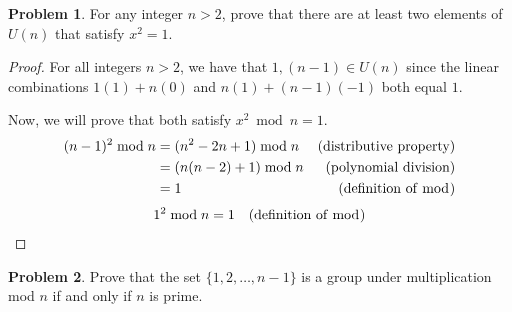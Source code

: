 \documentclass[12pt,reqno]{article}
\theoremstyle{plain}
\theoremstyle{definition}
\newtheorem{problem}{Problem}
\begin{document}
\newpage


\begin{problem} 
For any integer $n > 2$, prove that there are at least two elements of $U(n)$ that satisfy $x^2 = 1$. 
\end{problem}

\begin{proof}
    For all integers $n>2$, we have that $1,(n-1)\in U(n)$ since the linear combinations $1(1) + n(0)$ and $n(1)+(n-1)(-1)$ both equal $1$.

    Now, we will prove that both satisfy $x^2\bmod{n}=1$.
    \begin{align*}
        (n-1)^2\bmod{n} &= (n^2-2n+1)\bmod{n} & \text{(distributive property)}\\
        &= (n(n-2) + 1)\bmod{n} & \text{(polynomial division)}\\
        &= 1 & \text{(definition of $\bmod$)}
    \end{align*}
    \begin{align*}
        1^2 \bmod{n} &= 1 & \text{(definition of $\bmod$)}
    \end{align*}
\end{proof}

\newpage


\begin{problem} 
Prove that the set $\{1,2,\ldots,n-1\}$ is a group under multiplication mod $n$ if and only if $n$ is prime.
\end{problem}
\end{document}
